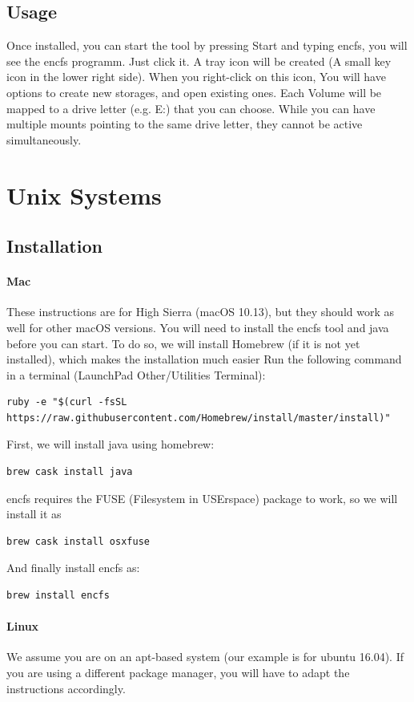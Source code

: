 \documentclass[a4paper,10pt]{report}
\begin{document}
\subsection{Usage}
Once installed, you can start the tool by pressing Start and typing encfs, you will see the encfs programm. Just click it.
A tray icon will be created (A small key icon in the lower right side). 
When you right-click on this icon, You will have options to create new storages, and open existing ones. 
Each Volume will be mapped to a drive letter (e.g. E:) that you can choose. 
While you can have multiple mounts pointing to the same drive letter, they cannot be active simultaneously.

\section{Unix Systems}

\subsection{Installation}
\paragraph{Mac}
These instructions are for High Sierra (macOS 10.13), but they should work as well for other macOS versions.
You will need to install the encfs tool and java before you can start. To do so, we will install Homebrew (if it is not yet installed), which makes the installation much easier
Run the following command in a terminal (LaunchPad \textrightarrow Other/Utilities \textrightarrow Terminal):
\begin{lstlisting}
ruby -e "$(curl -fsSL https://raw.githubusercontent.com/Homebrew/install/master/install)"
\end{lstlisting}
First, we will install java using homebrew:
\begin{lstlisting}
brew cask install java
\end{lstlisting}
encfs requires the FUSE (Filesystem in USErspace) package to work, so we will install it as 
\begin{lstlisting}
brew cask install osxfuse
\end{lstlisting}
And finally install encfs as:
\begin{lstlisting}
brew install encfs
\end{lstlisting}



\paragraph{Linux}
We assume you are on an apt-based system (our example is for ubuntu 16.04). If you are using a different package manager, you will have to adapt the instructions accordingly.
\end{document}
